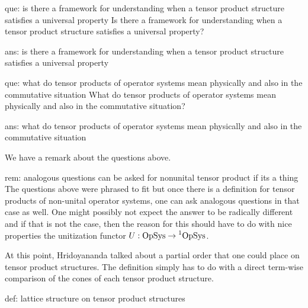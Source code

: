 \documentclass[main.tex]{subfiles}
\begin{document}
\begin{Question}{}{que: is there a framework for understanding when a tensor product structure satisfies a universal property}
Is there a framework for understanding when a tensor product structure satisfies a universal property? 
\end{Question}
\begin{Answer}{}{ans: is there a framework for understanding when a tensor product structure satisfies a universal property}

\end{Answer}

\begin{Question}{}{que: what do tensor products of operator systems mean physically and also in the commutative situation}
What do tensor products of operator systems mean physically and also in the commutative situation?
\end{Question}
\begin{Answer}{}{ans: what do tensor products of operator systems mean physically and also in the commutative situation}

\end{Answer}

We have a remark about the questions above.

\begin{remark}{}{rem: analogous questions can be asked for nonunital tensor product if its a thing}
The questions above were phrased to fit  but once there is a definition for tensor products of non-unital operator systems, one can ask analogous questions in that case as well. One might possibly not expect the answer to be radically different and if that is not the case, then the reason for this should have to do with nice properties the unitization functor $U: \operatorname{OpSys} \to \operatorname{\prescript{1}{}{OpSys}}$. 
\end{remark}

At this point, Hridoyananda talked about a partial order that one could place on tensor product structures. The definition simply has to do with a direct term-wise comparison of the cones of each tensor product structure. 

\begin{definition}{}{def: lattice structure on tensor product structures}

\end{definition}
\end{document}

